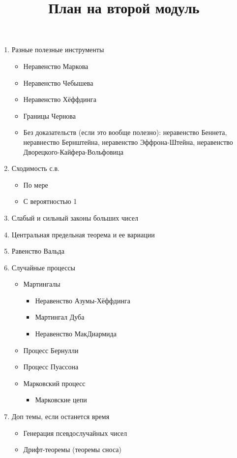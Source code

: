 \documentclass[12pt]{article}
\title{План на второй модуль}
\begin{document}

\begin{enumerate}
  \item Разные полезные инструменты
  \begin{itemize}
    \item Неравенство Маркова
    \item Неравенство Чебышева
    \item Неравенство Хёффдинга
    \item Границы Чернова
    \item Без доказательств (если это вообще полезно): неравенство Беннета, неравнество Бернштейна, неравенство Эффрона-Штейна, неравенство Дворецкого-Кайфера-Вольфовица
  \end{itemize}
  \item Сходимость с.в.
  \begin{itemize}
    \item По мере
    \item С вероятностью 1
  \end{itemize}
  \item Слабый и сильный законы больших чисел
  \item Центральная предельная теорема и ее вариации
  \item Равенство Вальда
  \item Случайные процессы
  \begin{itemize}
    \item Мартингалы
    \begin{itemize}
      \item Неравенство Азумы-Хёффдинга
      \item Мартингал Дуба
      \item Неравенство МакДиармида
    \end{itemize}
    \item Процесс Бернулли
    \item Процесс Пуассона
    \item Марковский процесс
    \begin{itemize}
      \item Марковские цепи
    \end{itemize}
  \end{itemize}
  \item Доп темы, если останется время
  \begin{itemize}
    \item Генерация псевдослучайных чисел
    \item Дрифт-теоремы (теоремы сноса)
  \end{itemize}
\end{enumerate}
\end{document}
